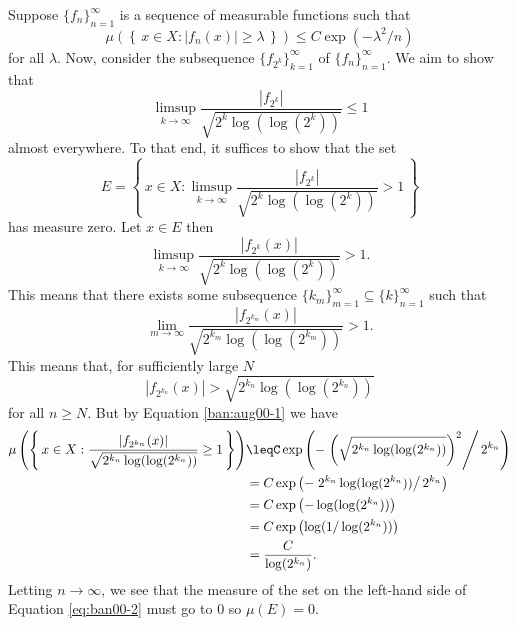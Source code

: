 \begin{solution}
  Suppose ${\{f_n\}}_{n=1}^\infty$ is a sequence of measurable functions
  such that
  \begin{equation}
    \label{ban:aug00-1}%
    \mu\left(\left\{\,x\in X:|f_n(x)|\geq\lambda\,\right\}\right)\leq C
    \exp(-\lambda^2/n)
  \end{equation}
    for all $\lambda$. Now, consider the subsequence
  ${\{f_{2^k}\}}_{k=1}^\infty$ of ${\{f_n\}}_{n=1}^\infty$. We aim to show
  that
  \[
    \limsup_{k\to\infty}\frac{|f_{2^k}|}{\sqrt{2^k\log(\log(2^k))}}\leq 1
  \]
  almost everywhere. To that end, it suffices to show that the set
  \[
    E=%
    \left\{\,%
      x\in
      X:\limsup_{k\to\infty}\frac{|f_{2^k}|}{\sqrt{2^k\log(\log(2^k))}}>1%
      \,%
    \right\}
  \]
  has measure zero. Let $x\in E$ then
  \[
    \limsup_{k\to\infty} \frac{|f_{2^k}(x)|}{\sqrt{2^k\log(\log(2^k))}}>1.
  \]
  This means that there exists some subsequence
  $\{k_m\}_{m=1}^\infty\subseteq\{k\}_{n=1}^\infty$ such that
  \[
    \lim_{m\to\infty}\frac{|f_{2^{k_m}}(x)|}{\sqrt{2^{k_m}\log(\log(2^{k_m}))}}>1.
  \]
  This means that, for sufficiently large $N$
  \[
    |f_{2^{k_n}}(x)|>\sqrt{2^{k_n}\log(\log(2^{k_n}))}
  \]
  for all $n\geq N$. But by Equation \eqref{ban:aug00-1} we have
  \begin{equation}
    \label{eq:ban00-2}
    \begin{aligned}
      \mu\left(\left\{\,%
          x\in
          X:\frac{|f_{2^{k_n}}(x)|}{\sqrt{2^{k_n}\log(\log(2^{k_n}))}}\geq
          1 \,\right\}\right) &\leq%
      C\exp\left(-\left.
          \left(\sqrt{2^{k_n}\log(\log(2^{k_n}))}\right)^2\right/2^{k_n}%
      \right)\\
      &=C\exp\left(-\left.2^{k_n}\log(\log(2^{k_n}))\right/2^{k_n} \right)\\
      &=C\exp\left(-\log(\log(2^{k_n}))\right)\\
      &=C\exp\left(\log(1/\log(2^{k_n}))\right)\\
      &=\frac{C}{\log(2^{k_n})}.
    \end{aligned}
  \end{equation}
  Letting $n\to\infty$, we see that the measure of the set on the left-hand
  side of Equation \eqref{eq:ban00-2} must go to $0$ so $\mu(E)=0$.
\end{solution}

